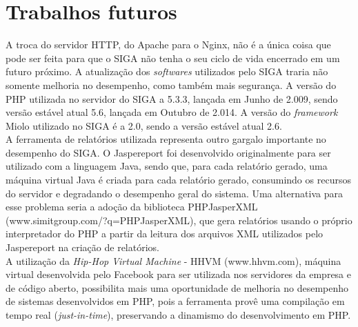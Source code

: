 \section{Trabalhos futuros}
A troca do servidor HTTP, do Apache para o Nginx, não é a única coisa que pode 
ser feita para que o SIGA não tenha o seu ciclo de vida encerrado em um futuro 
próximo. A atualização dos \textit{softwares} utilizados pelo SIGA traria não 
somente melhoria no desempenho, como também mais segurança. A versão do PHP 
utilizada no servidor do SIGA a 5.3.3, lançada em Junho de 2.009, sendo versão 
estável atual 5.6, lançada em Outubro de 2.014. A versão do 
\textit{framework} Miolo utilizado no SIGA é a 2.0, sendo a versão estável 
atual 2.6.\\
A ferramenta de relatórios utilizada representa outro gargalo importante no 
desempenho do SIGA. O Jaspereport foi desenvolvido originalmente para ser 
utilizado com a linguagem Java, sendo que, para cada relatório gerado, uma 
máquina virtual Java é criada para cada relatório gerado, consumindo os 
recursos do servidor e degradando o desempenho geral do sistema. Uma 
alternativa para esse problema seria a adoção da biblioteca PHPJasperXML 
(www.simitgroup.com/?q=PHPJasperXML), que gera relatórios usando o próprio 
interpretador do PHP a partir da leitura dos arquivos XML utilizados 
pelo Jaspereport na criação de relatórios.\\
A utilização da \textit{Hip-Hop Virtual Machine} - HHVM (www.hhvm.com), máquina 
virtual desenvolvida pelo Facebook para ser utilizada nos servidores da empresa 
e de código aberto, possibilita mais uma oportunidade de melhoria no desempenho 
de sistemas desenvolvidos em PHP, pois a ferramenta provê uma compilação em 
tempo real (\textit{just-in-time}), preservando a dinamismo do desenvolvimento 
em PHP.